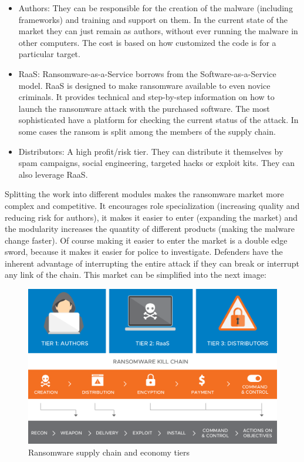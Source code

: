 \begin{itemize}
	\item Authors: They can be responsible for the creation of the malware (including frameworks) and training and support on them. In the current state of the market they can just remain as authors, without ever running the malware in other computers. The cost is based on how customized the code is for a particular target.
	\item RaaS: Ransomware-as-a-Service borrows from the Software-as-a-Service model. RaaS is designed to make ransomware available to even novice criminals. It provides technical and step-by-step information on how to launch the ransomware attack with the purchased software. The most sophisticated have a platform for checking the current status of the attack. In some cases the ransom is split among the members of the supply chain.
	\item Distributors: A high profit/risk tier. They can distribute it themselves by spam campaigns, social engineering, targeted hacks or exploit kits. They can also leverage RaaS.
\end{itemize}
\linej
Splitting the work into different modules makes the ransomware market more complex and competitive.
It encourages role specialization (increasing quality and reducing risk for authors), it makes it easier to enter (expanding the market) and the modularity increases the quantity of different products (making the malware change faster).
\linej
Of course making it easier to enter the market is a double edge sword, because it makes it easier for police to investigate.
Defenders have the inherent advantage of interrupting the entire attack if they can break or interrupt any link of the chain.
\linej
This market can be simplified into the next image:
\begin{figure}[H]
	\centering
	\includegraphics[width=\textwidth]{figuras/ransomware_chain.png}
	\caption{Ransomware supply chain and economy tiers\cite{ransomware_economy}}
\end{figure}

